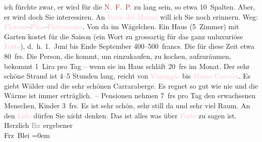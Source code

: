                ich fürchte zwar, er wird für die \textcolor{brown}{N. F. P.}{}\ledrightnote{\textcolor{brown}{Neue Freie Presse}} zu lang
               sein, so etwa 10 Spalten. Aber, er wird doch Sie interessiren.\pend
           \pstart
           An \textcolor{pink}{Forte dei Marmi}{}\ledrightnote{\textcolor{pink}{Forte dei Marmi}} will ich Sie noch erinnern.
               Weg: \textcolor{pink}{Florenz}{}\ledrightnote{\textcolor{pink}{Florenz}}–\textcolor{pink}{Pisa}{}\ledrightnote{\textcolor{pink}{Pisa}}–\textcolor{pink}{Pietrasanta}{}\ledrightnote{\textcolor{pink}{Pietrasanta}}. Von da im Wägelchen.
               Ein Haus (5 Zimmer) mit Garten kostet für die Saison (ein Wort zu grossartig für das
               ganz unluxuriöse \textcolor{pink}{Forte}{}\ledrightnote{\textcolor{pink}{Forte dei Marmi}}), d. h.
                  1. Juni bis Ende September 400–500 francs. Die \label{K_L01998_3v}\label{K_L01998_3h} für diese Zeit etwa 80 frs.
               Die Person, die kommt, um einzukaufen, zu kochen, aufzuräumen, bekommt 1 Lira pro Tag
               – wenn sie im Haus schläft 20 frs im Monat. {\pb}Der sehr schöne Strand ist 4–5 Stunden
               lang, reicht von \textcolor{pink}{Viareggio}{}\ledrightnote{\textcolor{pink}{Viareggio}} bis \textcolor{pink}{Massa Carrara}{}\ledrightnote{\textcolor{pink}{Massa}}. Es giebt Wälder und die sehr schönen Carraraberge. Es regnet so gut wie nie und die Wärme
               ist immer erträglich. –\pend
           \pstart
           Pensionen nehmen 7 frs pro Tag den erwachsenen Menschen, Kinder 3 frs.\pend
           \pstart
           Es ist sehr schön, sehr still da und sehr viel Raum. An den \textcolor{pink}{Lido}{}\ledrightnote{\textcolor{pink}{Lido}} dürfen Sie nicht denken.\pend
           \pstart
           Das ist alles was über \textcolor{pink}{Forte}{}\ledrightnote{\textcolor{pink}{Forte dei Marmi}} zu sagen ist.\pend
           \pstart
           Herzlich \textcolor{gray}{Ihr} ergebener{\\[\baselineskip]}\spacefill\mbox{Frz Blei}\pend
           \leftskip=0em{}\endnumbering{}  
      
